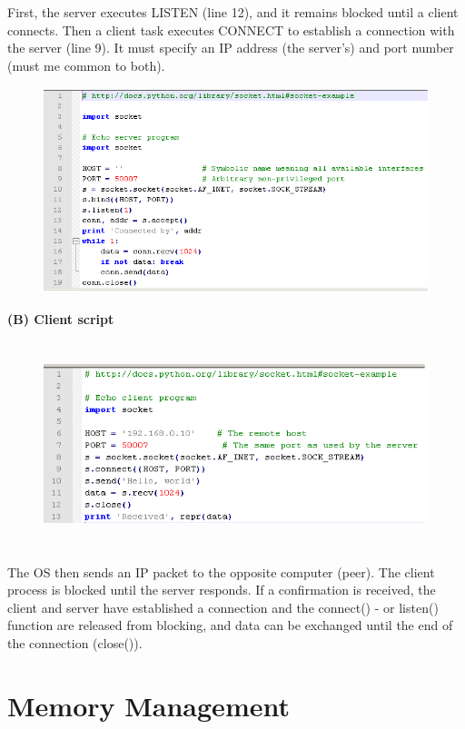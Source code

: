 First, the server executes LISTEN (line 12), and it remains blocked until a client connects. Then a client task executes CONNECT to establish a connection with the server (line 9). It must specify an IP address (the server's) and port number (must me common to both).

 	\begin{figure}[h]
    \centering
    \includegraphics[width=14cm, height=6cm]{Images/image197.png}
    \label{fig:Fig 64}
    \end{figure}

{\bf(B) Client script}\\

 	\begin{figure}[h]
    \centering
    \includegraphics[width=14cm, height=6cm]{Images/image198.png}
    \label{fig:Fig 64}
    \end{figure}

The OS then sends an IP packet to the opposite computer (peer). The client process is blocked until the server responds. If a confirmation is received, the client and server have established a connection and the connect() - or listen() function are released from blocking, and data can be exchanged until the end of the connection (close()).
\nsl{\newpage}

\section{Memory Management}

